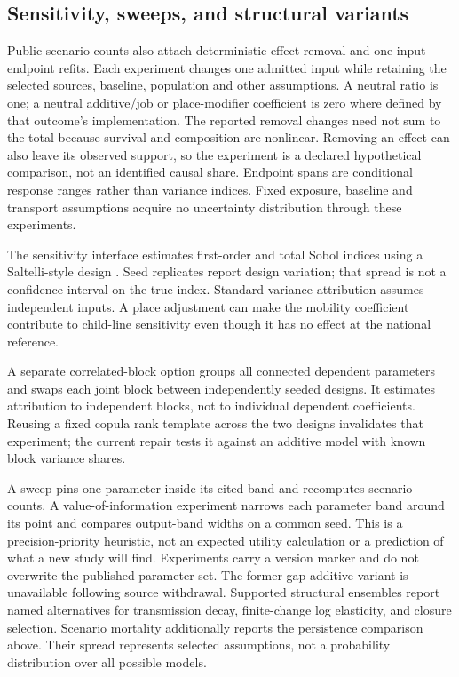 \documentclass[10pt]{article}
\begin{document}
\subsection{Sensitivity, sweeps, and structural variants}
Public scenario counts also attach deterministic effect-removal and
one-input endpoint refits. Each experiment changes one admitted input while
retaining the selected sources, baseline, population and other assumptions.
A neutral ratio is one; a neutral additive/job or place-modifier coefficient
is zero where defined by that outcome's implementation. The reported removal
changes need not sum to the total because survival and composition are
nonlinear. Removing an effect can also leave its observed support, so the
experiment is a declared hypothetical comparison, not an identified causal
share. Endpoint spans are conditional response ranges rather than variance
indices. Fixed exposure, baseline and transport assumptions acquire no
uncertainty distribution through these experiments.

The sensitivity interface estimates first-order and total Sobol indices
using a Saltelli-style design \cite{sobol2001,saltelli2002}. Seed replicates
report design variation; that spread is not a confidence interval on the
true index. Standard variance attribution assumes independent inputs.
A place adjustment can make the mobility coefficient contribute to
child-line sensitivity even though it has no effect at the national
reference.

A separate correlated-block option groups all connected dependent
parameters and swaps each joint block between independently seeded
designs. It estimates attribution to independent blocks, not to
individual dependent coefficients. Reusing a fixed copula rank template
across the two designs invalidates that experiment; the current repair
tests it against an additive model with known block variance shares.

A sweep pins one parameter inside its cited band and recomputes scenario
counts. A value-of-information experiment narrows each parameter band
around its point and compares output-band widths on a common seed.
This is a precision-priority heuristic, not an expected utility
calculation or a prediction of what a new study will find. Experiments
carry a version marker and do not overwrite the published parameter set.
The former gap-additive variant is unavailable following source withdrawal.
Supported structural ensembles report named alternatives for
transmission decay, finite-change log elasticity, and closure selection.
Scenario mortality additionally reports the persistence comparison above.
Their spread represents
selected assumptions, not a probability distribution over all possible
models.
\end{document}
